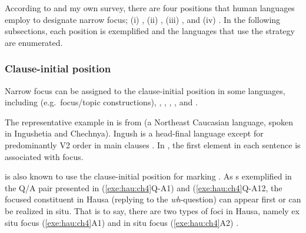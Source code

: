 According to \citet{fery:krifka:08} and my own survey, there are four
positions that human languages employ to designate narrow focus; (i)
, (ii) , (iii) ,
and (iv) . In the following subsections, each position
is exemplified and the languages that use the strategy are enumerated.


\subsubsection{Clause-initial position}
\label{4:sssec:clause-initial}


Narrow focus can be assigned to the clause-initial position in some
languages, including  (e.g.\ focus/topic 
constructions),  \citep{nichols:11},
 \citep{drubig:03},  \citep{press:86},
 \citep{jacobs:05}, and 
\citep{hartmann:zimmermann:07,buring:10}.



The representative example in  is from
 (a Northeast Caucasian language, spoken in Ingushetia and
Chechnya).  Ingush is a head-final language except for predominantly
V2 order in main clauses \citep{nichols:11}. In ,
the first element in each sentence is associated with focus.



 is also known to use the clause-initial position for
marking  \citep{buring:10}. As s exemplified in the Q/A pair
presented in (\ref{exe:hau:ch4}Q-A1) and (\ref{exe:hau:ch4}Q-A12, the
focused constituent in Hausa (replying to the \textit{wh}-question)
can appear first or can be realized in situ.  That is to say,
there are two types of foci in Hausa, namely ex situ focus
(\ref{exe:hau:ch4}A1) and in situ focus (\ref{exe:hau:ch4}A2)
\citep{hartmann:zimmermann:07}.

